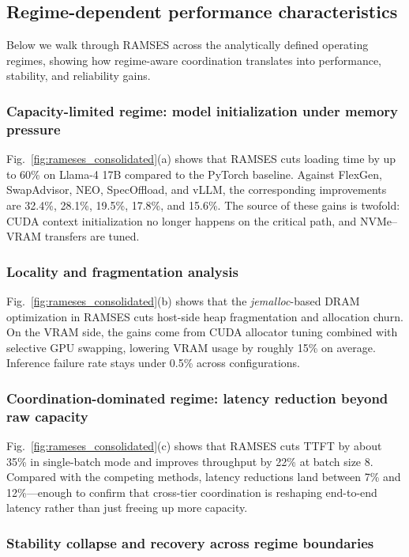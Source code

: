 \subsection{Regime-dependent performance characteristics}
Below we walk through RAMSES across the analytically defined operating regimes, showing how regime-aware coordination translates into performance, stability, and reliability gains.
\subsubsection{Capacity-limited regime: model initialization under memory pressure}

Fig.~\ref{fig:rameses_consolidated}(a) shows that RAMSES cuts loading time by up to 60\% on Llama-4 17B compared to the PyTorch baseline.
Against FlexGen, SwapAdvisor, NEO, SpecOffload, and vLLM, the corresponding improvements are 32.4\%, 28.1\%, 19.5\%, 17.8\%, and 15.6\%.
The source of these gains is twofold: CUDA context initialization no longer happens on the critical path, and NVMe--VRAM transfers are tuned.

\subsubsection{Locality and fragmentation analysis}

Fig.~\ref{fig:rameses_consolidated}(b) shows that the \textit{jemalloc}-based DRAM optimization in RAMSES cuts host-side heap fragmentation and allocation churn.
On the VRAM side, the gains come from CUDA allocator tuning combined with selective GPU swapping, lowering VRAM usage by roughly 15\% on average.
Inference failure rate stays under 0.5\% across configurations.

\subsubsection{Coordination-dominated regime: latency reduction beyond raw capacity}

Fig.~\ref{fig:rameses_consolidated}(c) shows that RAMSES cuts TTFT by about 35\% in single-batch mode and improves throughput by 22\% at batch size 8.
Compared with the competing methods, latency reductions land between 7\% and 12\%---enough to confirm that cross-tier coordination is reshaping end-to-end latency rather than just freeing up more capacity.

\subsubsection{Stability collapse and recovery across regime boundaries}

